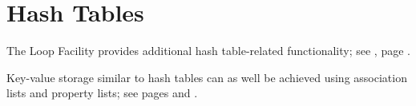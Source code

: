 %
%

\section{Hash Tables}
The Loop Facility provides additional hash table-related
functionality; see , page \pageref{section:Loop Facility}.

Key-value storage similar to hash tables can as well be achieved using
association lists and property lists; see
pages \pageref{section:Association Lists} and \pageref{:property_lists}.


